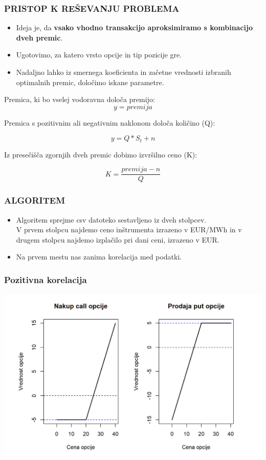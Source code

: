 \documentclass[10pt]{beamer}
\begin{document}
\begin{frame}
\frametitle{PRISTOP K REŠEVANJU PROBLEMA}
\begin{itemize}
\item{Ideja je, da \textbf{vsako vhodno transakcijo
aproksimiramo s kombinacijo dveh premic}. }

\item{Ugotovimo, za katero vrsto
opcije in tip pozicije gre.}

\item{Nadaljno lahko iz smernega koeficienta in
začetne vrednosti izbranih optimalnih premic, določimo iskane parametre.}
\end{itemize}
Premica, ki bo vselej vodoravna določa premijo: \[ y =  premija \]

Premica s pozitivnim ali negativnim naklonom določa količino (Q):

\[ y =  Q * S_t + n\]

Iz presečišča zgornjih dveh premic dobimo izvršilno ceno (K):

\[ K = \frac{premija - n}{Q} \]
\end{frame}


\begin{frame}
\frametitle{ALGORITEM}
\begin{itemize}
\item{Algoritem sprejme csv datoteko sestavljeno iz dveh stolpcev. \\
V prvem
stolpcu najdemo ceno inštrumenta izrazeno v EUR/MWh in v drugem stolpcu
najdemo izplačilo pri dani ceni, izrazeno v EUR. }
\item{Na prvem mestu nas zanima korelacija med podatki.}
\end{itemize}
\end{frame}


\begin{frame}
\frametitle{Pozitivna korelacija}
\includegraphics[width=1\textwidth]{neg_kor.png}

\end{frame}
\end{document}
